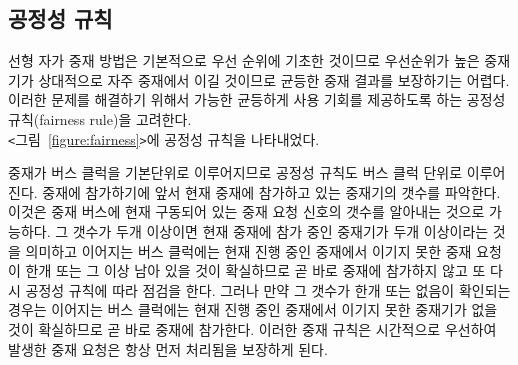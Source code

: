 \subsection{공정성 규칙}
선형 자가 중재 방법은 기본적으로 우선 순위에 기초한 것이므로
우선순위가 높은 중재기가 상대적으로 자주 중재에서 이길 것이므로 균등한 중재 결과를 보장하기는 어렵다.
이러한 문제를 해결하기 위해서 가능한 균등하게 사용 기회를 제공하도록 하는 공정성 규칙(fairness rule)을
고려한다. \\
{\tt <}그림~\ref{figure:fairness}{\tt >}에 공정성 규칙을 나타내었다.

중재가 버스 클럭을 기본단위로 이루어지므로 공정성 규칙도 버스 클럭 단위로 이루어진다.
중재에 참가하기에 앞서 현재 중재에 참가하고 있는 중재기의 갯수를 파악한다.
이것은 중재 버스에 현재 구동되어 있는 중재 요청 신호의 갯수를 알아내는 것으로 가능하다.
그 갯수가 두개 이상이면 현재 중재에 참가 중인 중재기가 두개 이상이라는 것을 의미하고
이어지는 버스 클럭에는 현재 진행 중인 중재에서 이기지 못한 중재 요청이 한개 또는 그 이상
남아 있을 것이 확실하므로 곧 바로 중재에 참가하지 않고 또 다시 공정성 규칙에 따라 점검을 한다.
그러나 만약 그 갯수가 한개 또는 없음이 확인되는 경우는 이어지는 버스 클럭에는
현재 진행 중인 중재에서 이기지 못한 중재기가 없을 것이 확실하므로
곧 바로 중재에 참가한다. 이러한 중재 규칙은 시간적으로 우선하여 발생한 중재 요청은
항상 먼저 처리됨을 보장하게 된다.
%
%
